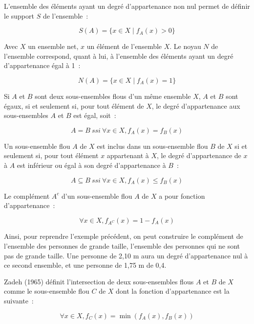 L’ensemble des éléments ayant un degré d’appartenance non nul permet
de définir le support $S$ de l’ensemble :

\begin{equation}
  S(A) = \{x ∈ X \mid f_A(x) > 0\}
\end{equation}

Avec $X$ un ensemble net, $x$ un élément de l’ensemble $X$. Le noyau
$N$ de l’ensemble correspond, quant à lui, à l’ensemble des éléments
ayant un degré d’appartenance égal à 1 :

\begin{equation}
  N(A) = \{x ∈ X \mid f_A(x) = 1\}
\end{equation}

Si $A$ et $B$ sont deux sous-ensembles flous d’un même ensemble $X$,
$A$ et $B$ sont égaux, si et seulement si, pour tout élément de $X$,
le degré d’appartenance aux sous-ensembles $A$ et $B$ est égal, soit :

\begin{equation}
  A = B\ ssi\ ∀x ∈ X, f_A(x) = f_B(x)
\end{equation}

Un sous-ensemble flou $A$ de $X$ est inclus dans un sous-ensemble flou
$B$ de $X$ si et seulement si, pour tout élément $x$ appartenant à
$X$, le degré d’appartenance de $x$ à $A$ est inférieur ou égal à son
degré d’appartenance à $B$ :

\begin{equation}
  A ⊆ B\ ssi\ ∀x ∈ X, f_A(x) ≤ f_B(x)
\end{equation}

Le complément $A^c$ d’un sous-ensemble flou $A$ de $X$ a pour fonction
d’appartenance :

\begin{equation}
  \label{eq:comp}
  ∀x ∈ X, f_{A^C}(x) = 1 − f_A(x)
\end{equation}

Ainsi, pour reprendre l’exemple précédent, on peut construire le
complément de l’ensemble des personnes de grande taille, l’ensemble
des personnes qui ne sont pas de grande taille. Une personne de 2,10 m
aura un degré d’appartenance nul à ce second ensemble, et une personne
de 1,75 m de 0,4.

Zadeh (1965) définit l’intersection de deux sous-ensembles flous $A$
et $B$ de $X$ comme le sous-ensemble flou $C$ de $X$ dont la fonction
d’appartenance est la suivante :

\begin{equation}
  \label{eq:norm_zadeh}
  ∀x ∈ X, f_C (x) = \min(f_A(x), f_B(x))
\end{equation}

